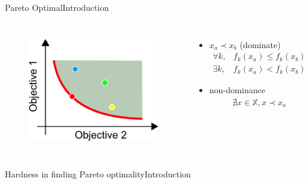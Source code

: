 \begin{frame}{Pareto Optimal}{Introduction}
\begin{columns}
	\begin{figure}
		\centering
		\includegraphics[width=\linewidth]{figure/pareto_optimal}
		\label{fig:pareot_optimal}
	\end{figure}
\begin{minipage}{\textwidth}
\begin{itemize}
\item $ x_{a} \prec x_{b} $ (dominate)
\begin{eqnarray*}
\forall k, & f_{k} (x_{a}) \leq f_{k} (x_{b}) \\
\exists k, & f_{k} (x_{a}) < f_{k} (x_{b})
\end{eqnarray*}
\item non-dominance
\begin{eqnarray*}
\nexists x \in \mathbb{X}, x \prec x_{a}
\end{eqnarray*}
\end{itemize}
\end{minipage}
\end{columns}
\end{frame}

\begin{frame}{Hardness in finding Pareto optimality}{Introduction}

\end{frame}